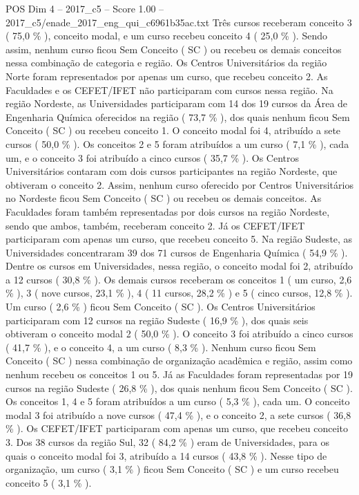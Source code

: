 \begin{textsample}{POS Dim 4 – 2017\_c5 – Score 1.00 – 2017\_c5/enade\_2017\_eng\_qui\_c6961b35ac.txt}
Três cursos receberam conceito 3 ( 75,0 \% ), conceito modal, e um curso recebeu conceito 4 ( 25,0 \% ).
Sendo assim, nenhum curso ficou Sem Conceito ( SC ) ou recebeu os demais conceitos nessa combinação de categoria e região.
Os Centros Universitários da região Norte foram representados por apenas um curso, que recebeu conceito 2.
As Faculdades e os CEFET/IFET não participaram com cursos nessa região.
Na região Nordeste, as Universidades participaram com 14 dos 19 cursos da Área de Engenharia Química oferecidos na região ( 73,7 \% ), dos quais nenhum ficou Sem Conceito ( SC ) ou recebeu conceito 1.
O conceito modal foi 4, atribuído a sete cursos ( 50,0 \% ).
Os conceitos 2 e 5 foram atribuídos a um curso ( 7,1 \% ), cada um, e o conceito 3 foi atribuído a cinco cursos ( 35,7 \% ).
Os Centros Universitários contaram com dois cursos participantes na região Nordeste, que obtiveram o conceito 2.
Assim, nenhum curso oferecido por Centros Universitários no Nordeste ficou Sem Conceito ( SC ) ou recebeu os demais conceitos.
As Faculdades foram também representadas por dois cursos na região Nordeste, sendo que ambos, também, receberam conceito 2.
Já os CEFET/IFET participaram com apenas um curso, que recebeu conceito 5.
Na região Sudeste, as Universidades concentraram 39 dos 71 cursos de Engenharia Química ( 54,9 \% ).
Dentre os cursos em Universidades, nessa região, o conceito modal foi 2, atribuído a 12 cursos ( 30,8 \% ).
Os demais cursos receberam os conceitos 1 ( um curso, 2,6 \% ), 3 ( nove cursos, 23,1 \% ), 4 ( 11 cursos, 28,2 \% ) e 5 ( cinco cursos, 12,8 \% ).
Um curso ( 2,6 \% ) ficou Sem Conceito ( SC ).
Os Centros Universitários participaram com 12 cursos na região Sudeste ( 16,9 \% ), dos quais seis obtiveram o conceito modal 2 ( 50,0 \% ).
O conceito 3 foi atribuído a cinco cursos ( 41,7 \% ), e o conceito 4, a um curso ( 8,3 \% ).
Nenhum curso ficou Sem Conceito ( SC ) nessa combinação de organização acadêmica e região, assim como nenhum recebeu os conceitos 1 ou 5.
Já as Faculdades foram representadas por 19 cursos na região Sudeste ( 26,8 \% ), dos quais nenhum ficou Sem Conceito ( SC ).
Os conceitos 1, 4 e 5 foram atribuídos a um curso ( 5,3 \% ), cada um.
O conceito modal 3 foi atribuído a nove cursos ( 47,4 \% ), e o conceito 2, a sete cursos ( 36,8 \% ).
Os CEFET/IFET participaram com apenas um curso, que recebeu conceito 3.
Dos 38 cursos da região Sul, 32 ( 84,2 \% ) eram de Universidades, para os quais o conceito modal foi 3, atribuído a 14 cursos ( 43,8 \% ).
Nesse tipo de organização, um curso ( 3,1 \% ) ficou Sem Conceito ( SC ) e um curso recebeu conceito 5 ( 3,1 \% ).

\end{textsample}
